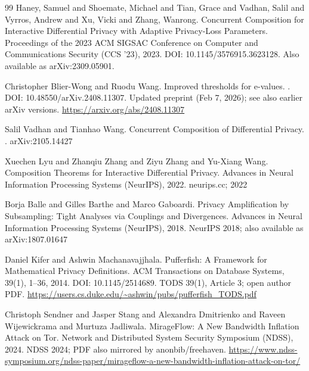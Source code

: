 \documentclass[11pt]{article}
\begin{document}
\begin{thebibliography}{99}
Haney, Samuel and Shoemate, Michael and Tian, Grace and Vadhan, Salil and Vyrros, Andrew and Xu, Vicki and Zhang, Wanrong.
\newblock Concurrent Composition for Interactive Differential Privacy with Adaptive Privacy-Loss Parameters.
\newblock Proceedings of the 2023 ACM SIGSAC Conference on Computer and Communications Security (CCS '23), 2023.
\newblock DOI: 10.1145/3576915.3623128.
\newblock Also available as arXiv:2309.05901.

Christopher Blier-Wong and Ruodu Wang.
\newblock Improved thresholds for e-values.
.
\newblock DOI: 10.48550/arXiv.2408.11307.
\newblock Updated preprint (Feb 7, 2026); see also earlier arXiv versions.
\newblock \url{https://arxiv.org/abs/2408.11307}

Salil Vadhan and Tianhao Wang.
\newblock Concurrent Composition of Differential Privacy.
.
\newblock arXiv:2105.14427

Xuechen Lyu and Zhanqiu Zhang and Ziyu Zhang and Yu-Xiang Wang.
\newblock Composition Theorems for Interactive Differential Privacy.
\newblock Advances in Neural Information Processing Systems (NeurIPS), 2022.
\newblock neurips.cc; 2022

Borja Balle and Gilles Barthe and Marco Gaboardi.
\newblock Privacy Amplification by Subsampling: Tight Analyses via Couplings and Divergences.
\newblock Advances in Neural Information Processing Systems (NeurIPS), 2018.
\newblock NeurIPS 2018; also available as arXiv:1807.01647

Daniel Kifer and Ashwin Machanavajjhala.
\newblock Pufferfish: A Framework for Mathematical Privacy Definitions.
\newblock ACM Transactions on Database Systems, 39(1), 1--36, 2014.
\newblock DOI: 10.1145/2514689.
\newblock TODS 39(1), Article 3; open author PDF.
\newblock \url{https://users.cs.duke.edu/~ashwin/pubs/pufferfish_TODS.pdf}

Christoph Sendner and Jasper Stang and Alexandra Dmitrienko and Raveen Wijewickrama and Murtuza Jadliwala.
\newblock MirageFlow: A New Bandwidth Inflation Attack on {Tor}.
\newblock Network and Distributed System Security Symposium (NDSS), 2024.
\newblock NDSS 2024; PDF also mirrored by anonbib/freehaven.
\newblock \url{https://www.ndss-symposium.org/ndss-paper/mirageflow-a-new-bandwidth-inflation-attack-on-tor/}


\end{thebibliography}
\end{document}
